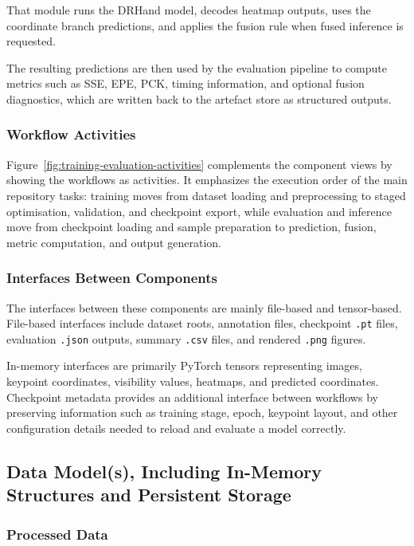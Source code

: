 ﻿\documentclass[11pt,a4paper]{article}
\begin{document}
That module runs the DRHand model, decodes heatmap outputs, uses the
coordinate branch predictions, and applies the fusion rule when fused
inference is requested.

\medskip

The resulting predictions are then used by the evaluation pipeline to compute
metrics such as SSE, EPE, PCK, timing information, and optional fusion
diagnostics, which are written back to the artefact store as structured
outputs.

\subsubsection*{Workflow Activities}

Figure~\ref{fig:training-evaluation-activities} complements the component
views by showing the workflows as activities.
It emphasizes the execution order of the main repository tasks: training moves
from dataset loading and preprocessing to staged optimisation, validation, and
checkpoint export, while evaluation and inference move from checkpoint loading
and sample preparation to prediction, fusion, metric computation, and output
generation.

\subsubsection*{Interfaces Between Components}

The interfaces between these components are mainly file-based and tensor-based.
File-based interfaces include dataset roots, annotation files, checkpoint
\texttt{.pt} files, evaluation \texttt{.json} outputs, summary \texttt{.csv}
files, and rendered \texttt{.png} figures.

\medskip

In-memory interfaces are primarily PyTorch tensors representing images,
keypoint coordinates, visibility values, heatmaps, and predicted coordinates.
Checkpoint metadata provides an additional interface between workflows by
preserving information such as training stage, epoch, keypoint layout, and
other configuration details needed to reload and evaluate a model correctly.

\subsection{Data Model(s), Including In-Memory Structures and Persistent Storage}

\subsubsection*{Processed Data}
\end{document}
